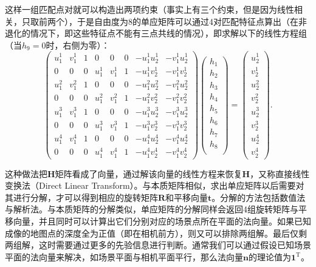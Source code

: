 这样一组匹配点对就可以构造出两项约束（事实上有三个约束，但是因为线性相关，只取前两个），于是自由度为8的单应矩阵可以通过4对匹配特征点算出（在非退化的情况下，即这些特征点不能有三点共线的情况），即求解以下的线性方程组（当$h_9 = 0$时，右侧为零）：
\begin{equation}
\begin{pmatrix}
u_{1}^{1}& v_{1}^{1}& 1 & 0 & 0 & 0 & -u_{1}^{1}u_{2}^{1} & -v_{1}^{1}u_{2}^{1}\\
0 & 0 & 0& u_{1}^{1}& v_{1}^{1}& 1 &  -u_{1}^{1}v_{2}^{1} & -v_{1}^{1}v_{2}^{1}\\
u_{1}^{2}& v_{1}^{2}& 1 & 0 & 0 & 0 & -u_{1}^{2}u_{2}^{2} & -v_{1}^{2}u_{2}^{2}\\
0 & 0 & 0& u_{1}^{2}& v_{1}^{2}& 1 &  -u_{1}^{2}v_{2}^{2} & -v_{1}^{2}v_{2}^{2}\\
u_{1}^{3}& v_{1}^{3}& 1 & 0 & 0 & 0 & -u_{1}^{3}u_{2}^{3} & -v_{1}^{3}u_{2}^{3}\\
0 & 0 & 0& u_{1}^{3}& v_{1}^{3}& 1 &  -u_{1}^{3}v_{2}^{3} & -v_{1}^{3}v_{2}^{3}\\
u_{1}^{4}& v_{1}^{4}& 1 & 0 & 0 & 0 & -u_{1}^{4}u_{2}^{4} & -v_{1}^{4}u_{2}^{4}\\
0 & 0 & 0& u_{1}^{4}& v_{1}^{4}& 1 &  -u_{1}^{4}v_{2}^{4} & -v_{1}^{4}v_{2}^{4}
\end{pmatrix}
\begin{pmatrix}
 h_{1}\\h_{2}\\h_{3}\\ h_{4}\\h_{5}\\h_{6}\\ h_{7}\\h_{8}\\  
\end{pmatrix}
=
\begin{pmatrix}
u_{2}^{1}\\ v_{2}^{1}\\ u_{2}^{2}\\ v_{2}^{2}\\u_{2}^{3}\\ v_{2}^{3}\\u_{2}^{4}\\ v_{2}^{4}
\end{pmatrix}.
\end{equation}

这种做法把$\bm{H}$矩阵看成了向量，通过解该向量的线性方程来恢复$\bm{H}$，又称直接线性变换法（Direct Linear Transform）。与本质矩阵相似，求出单应矩阵以后需要对其进行分解，才可以得到相应的旋转矩阵$\bm{R}$和平移向量$\bm{t}$。分解的方法包括数值法\textsuperscript{\cite{faugeras1988motion, Zhang1996}}与解析法\textsuperscript{\cite{malis2007deeper}}。与本质矩阵的分解类似，单应矩阵的分解同样会返回4组旋转矩阵与平移向量，并且同时可以计算出它们分别对应的场景点所在平面的法向量。如果已知成像的地图点的深度全为正值（即在相机前方），则又可以排除两组解。最后仅剩两组解，这时需要通过更多的先验信息进行判断。通常我们可以通过假设已知场景平面的法向量来解决，如场景平面与相机平面平行，那么法向量$\bm{n}$的理论值为$\bm{1}^\mathrm{T}$。

